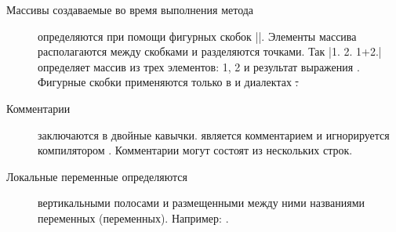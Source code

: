 \documentclass[a4paper,10pt,twoside]{book}
\begin{document}
\begin{description}

\item[Массивы создаваемые во время выполнения метода] определяются при помощи фигурных скобок \ct|{}|.
		 Элементы массива располагаются между скобками и разделяются точками.
		Так \ct|{1. 2. 1+2.}| определяет массив из трех элементов: 1, 2 и результат выражения .
		Фигурные скобки применяются только в \pharo и \squeak диалектах \st.


\item[Комментарии] заключаются в двойные кавычки.
		 является комментарием и игнорируется компилятором \pharo.
		Комментарии могут состоят из нескольких строк.
		

\item[Локальные переменные определяются]	вертикальными полосами \ct{| |} и размещенными между ними названиями переменных (переменных).
		Например: .	


\end{description}
\end{document}
